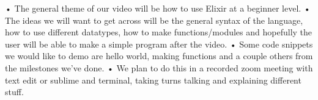•	The general theme of our video will be how to use Elixir at a beginner level. 
•	The ideas we will want to get across will be the general syntax of the language, 
  how to use different datatypes, how to make functions/modules and hopefully the user 
  will be able to make a simple program after the video. 
•	Some code snippets we would like to demo are hello world, making functions and a couple
  others from the milestones we’ve done. 
•	We plan to do this in a recorded zoom meeting with text edit or sublime and terminal, 
  taking turns talking and explaining different stuff. 
